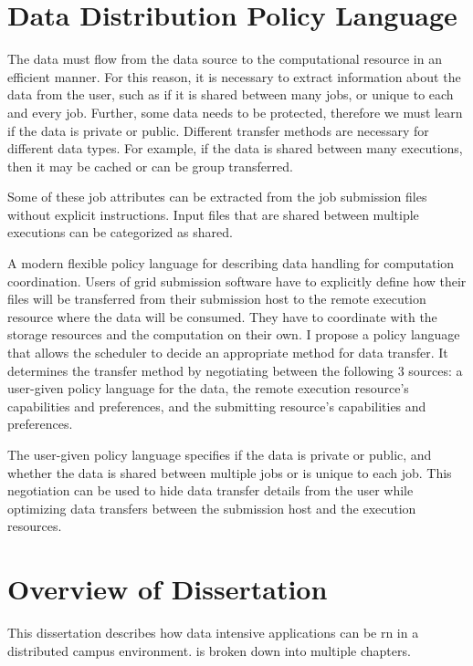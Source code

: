 \section{Data Distribution Policy Language}
The data must flow from the data source to the computational resource in an efficient manner.  For this reason, it is necessary to extract information about the data from the user, such as if it is shared between many jobs, or unique to each and every job.  Further, some data needs to be protected, therefore we must learn if the data is private or public.  Different transfer methods are necessary for different data types.  For example, if the data is shared between many executions, then it may be cached or can be group transferred.  

Some of these job attributes can be extracted from the job submission files without explicit instructions.  Input files that are shared between multiple executions can be categorized as shared.

A modern flexible policy language for describing data handling for computation coordination.  Users of grid submission software have to explicitly define how their files will be transferred from their submission host to the remote execution resource where the data will be consumed.  They have to coordinate with the storage resources and the computation on their own.  I propose a policy language that allows the scheduler to decide an appropriate method for data transfer.  It determines the transfer method by negotiating between the following 3 sources: a user-given policy language for the data, the remote execution resource's capabilities and preferences, and the submitting resource's capabilities and preferences.  

The user-given policy language specifies if the data is private or public, and whether the data is shared between multiple jobs or is unique to each job.  This negotiation can be used to hide data transfer details from the user while optimizing data transfers between the submission host and the execution resources.


\section{Overview of Dissertation}

This dissertation describes how data intensive applications can be rn in a distributed campus environment.   is broken down into multiple chapters.  

